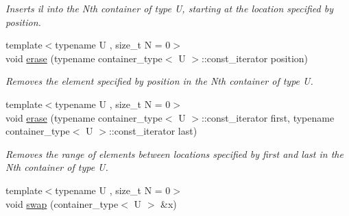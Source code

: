 \begin{DoxyCompactItemize}
\begin{DoxyCompactList}\small\item\em Inserts il into the Nth container of type U, starting at the location specified by position. \end{DoxyCompactList}\item 
\hypertarget{classheterogeneous_1_1heterodeque_3_01_t_00_01_types_8_8_8_4_a64776c315544a0e5e46a4f1ea7904ce5}{}{\footnotesize template$<$typename U , size\+\_\+t N = 0$>$ }\\void \hyperlink{classheterogeneous_1_1heterodeque_3_01_t_00_01_types_8_8_8_4_a64776c315544a0e5e46a4f1ea7904ce5}{erase} (typename container\+\_\+type$<$ U $>$\+::const\+\_\+iterator position)\label{classheterogeneous_1_1heterodeque_3_01_t_00_01_types_8_8_8_4_a64776c315544a0e5e46a4f1ea7904ce5}

\begin{DoxyCompactList}\small\item\em Removes the element specified by position in the Nth container of type U. \end{DoxyCompactList}\item 
\hypertarget{classheterogeneous_1_1heterodeque_3_01_t_00_01_types_8_8_8_4_a300ccfcdc15c332f78098ef7624f36fa}{}{\footnotesize template$<$typename U , size\+\_\+t N = 0$>$ }\\void \hyperlink{classheterogeneous_1_1heterodeque_3_01_t_00_01_types_8_8_8_4_a300ccfcdc15c332f78098ef7624f36fa}{erase} (typename container\+\_\+type$<$ U $>$\+::const\+\_\+iterator first, typename container\+\_\+type$<$ U $>$\+::const\+\_\+iterator last)\label{classheterogeneous_1_1heterodeque_3_01_t_00_01_types_8_8_8_4_a300ccfcdc15c332f78098ef7624f36fa}

\begin{DoxyCompactList}\small\item\em Removes the range of elements between locations specified by first and last in the Nth container of type U. \end{DoxyCompactList}\item 
\hypertarget{classheterogeneous_1_1heterodeque_3_01_t_00_01_types_8_8_8_4_a57399e8b403886fc095af9d415758be9}{}{\footnotesize template$<$typename U , size\+\_\+t N = 0$>$ }\\void \hyperlink{classheterogeneous_1_1heterodeque_3_01_t_00_01_types_8_8_8_4_a57399e8b403886fc095af9d415758be9}{swap} (container\+\_\+type$<$ U $>$ \&x)\label{classheterogeneous_1_1heterodeque_3_01_t_00_01_types_8_8_8_4_a57399e8b403886fc095af9d415758be9}


\end{DoxyCompactItemize}
